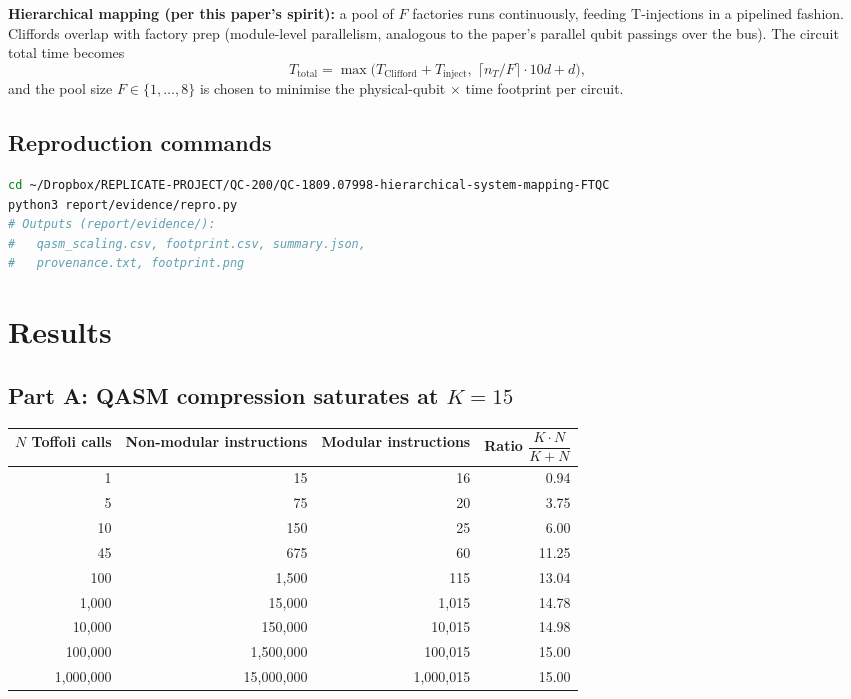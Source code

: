\documentclass[11pt]{article}
\begin{document}
\textbf{Hierarchical mapping (per this paper's spirit):} a pool of $F$
factories runs continuously, feeding T-injections in a pipelined fashion.
Cliffords overlap with factory prep (module-level parallelism, analogous to
the paper's parallel qubit passings over the bus).  The circuit total time
becomes
\[
T_\mathrm{total} = \max\!\Big(T_\mathrm{Clifford} + T_\mathrm{inject},\;
\big\lceil n_T / F \big\rceil \cdot 10d + d\Big),
\]
and the pool size $F \in \{1,\dots,8\}$ is chosen to minimise the physical-qubit
$\times$ time footprint per circuit.

\subsection{Reproduction commands}
\begin{lstlisting}[language=bash]
cd ~/Dropbox/REPLICATE-PROJECT/QC-200/QC-1809.07998-hierarchical-system-mapping-FTQC
python3 report/evidence/repro.py
# Outputs (report/evidence/):
#   qasm_scaling.csv, footprint.csv, summary.json,
#   provenance.txt, footprint.png
\end{lstlisting}

\section{Results}

\subsection{Part A: QASM compression saturates at $K=15$}

\begin{center}
\begin{tabular}{@{}rrrr@{}}
\toprule
$N$ Toffoli calls & Non-modular instructions & Modular instructions & Ratio $\dfrac{K\cdot N}{K+N}$ \\
\midrule
        1 &        15 &       16 &  0.94 \\
        5 &        75 &       20 &  3.75 \\
       10 &       150 &       25 &  6.00 \\
       45 &       675 &       60 & 11.25 \\
      100 &     1{,}500 &      115 & 13.04 \\
    1{,}000 &    15{,}000 &    1{,}015 & 14.78 \\
   10{,}000 &   150{,}000 &   10{,}015 & 14.98 \\
  100{,}000 & 1{,}500{,}000 &  100{,}015 & 15.00 \\
1{,}000{,}000 &15{,}000{,}000 &1{,}000{,}015 & 15.00 \\
\bottomrule
\end{tabular}
\end{center}
\end{document}
